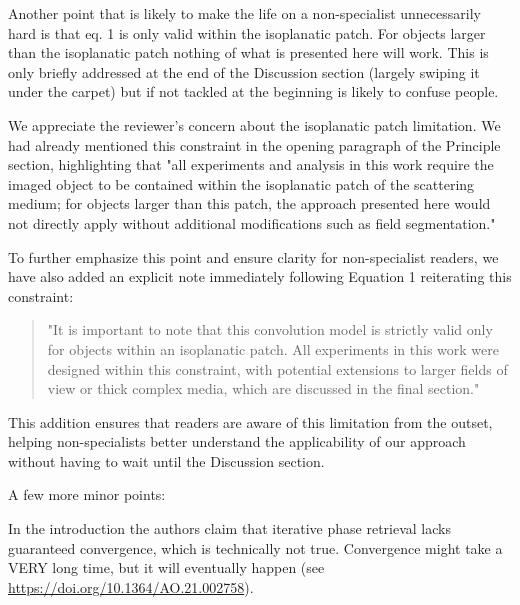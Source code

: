\documentclass[12pt]{article}
\newcommand{\hlred}[1]{\sethlcolor{red!30}\hl{#1}}
\newenvironment{solved_reviewercomment}
    {\begin{tcolorbox}[width=\linewidth,colback=gray!5,colframe=solved_commentcolor!50,title=Reviewer Comment,left=5pt,right=5pt]}
    {\end{tcolorbox}}
\newenvironment{ourresponse}
    {\begin{tcolorbox}[width=\linewidth,breakable,enhanced,colback=gray!5,colframe=responsecolor!50,title=Response,left=5pt,right=5pt]}
    {\end{tcolorbox}}
\begin{document}
\leavevmode\vspace{-\baselineskip}
    \begin{solved_reviewercomment}
        Another point that is likely to make the life on a non-specialist unnecessarily hard is that eq. 1 is only valid within the isoplanatic patch. For objects larger than the isoplanatic patch nothing of what is presented here will work. This is only briefly addressed at the end of the Discussion section (largely swiping it under the carpet) but if not tackled at the beginning is likely to confuse people.
        
    \end{solved_reviewercomment}
    \begin{ourresponse}
        We appreciate the reviewer's concern about the isoplanatic patch limitation. We had already mentioned this constraint in the opening paragraph of the Principle section, highlighting that "all experiments and analysis in this work require the imaged object to be contained within the isoplanatic patch of the scattering medium; for objects larger than this patch, the approach presented here would not directly apply without additional modifications such as field segmentation."

        To further emphasize this point and ensure clarity for non-specialist readers, we have also added an explicit note immediately following Equation 1 reiterating this constraint:
        
        \begin{quote}
            "It is important to note that this convolution model is strictly valid only for objects within an isoplanatic patch. All experiments in this work were designed within this constraint, with potential extensions to larger fields of view or thick complex media, which are discussed in the final section."
        \end{quote}
        
        This addition ensures that readers are aware of this limitation from the outset, helping non-specialists better understand the applicability of our approach without having to wait until the Discussion section.
    \end{ourresponse}
    
A few more minor points:
    
    \leavevmode\vspace{-\baselineskip}
        \begin{solved_reviewercomment}
            In the introduction the authors claim that iterative phase retrieval lacks guaranteed convergence, which is technically not true. Convergence might take a VERY long time, but it will eventually happen (see \url{https://doi.org/10.1364/AO.21.002758}).
        \end{solved_reviewercomment}

           
\end{document}
